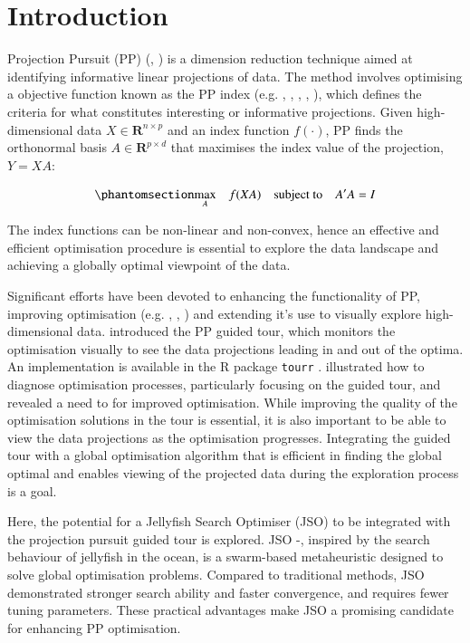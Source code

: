 \documentclass[
  number,
  preprint,
  3p]{elsarticle}
\begin{document}
\section{Introduction}\label{introduction}

Projection Pursuit (PP) (\citet{kr69}, \citet{FT74}) is a dimension
reduction technique aimed at identifying informative linear projections
of data. The method involves optimising a objective function known as
the PP index (e.g. \citet{hall1989polynomial},
\citet{cook1993projection}, \citet{lee2010projection},
\citet{Loperfido2018}, \citet{Loperfido2020}), which defines the
criteria for what constitutes interesting or informative projections.
Given high-dimensional data \(X \in \mathbf{R}^{n\times p}\) and an
index function \(f(\cdot)\), PP finds the orthonormal basis
\(A \in \mathbf{R}^{p \times d}\) that maximises the index value of the
projection, \(Y = XA\):

\begin{equation}\phantomsection\label{eq-optimization}{
\underset{A}{\max } \quad f(XA) \quad \text{subject to} \quad A'A = I
}\end{equation}

The index functions can be non-linear and non-convex, hence an effective
and efficient optimisation procedure is essential to explore the data
landscape and achieving a globally optimal viewpoint of the data.

Significant efforts have been devoted to enhancing the functionality of
PP, improving optimisation (e.g. \citet{posse1995},
\citet{marie-sainte2010}, \citet{grochowski2011}) and extending it's use
to visually explore high-dimensional data. \citet{cook1995grand}
introduced the PP guided tour, which monitors the optimisation visually
to see the data projections leading in and out of the optima. An
implementation is available in the R \citep{R} package \texttt{tourr}
\citep{tourr}. \citet{RJ-2021-105} illustrated how to diagnose
optimisation processes, particularly focusing on the guided tour, and
revealed a need to for improved optimisation. While improving the
quality of the optimisation solutions in the tour is essential, it is
also important to be able to view the data projections as the
optimisation progresses. Integrating the guided tour with a global
optimisation algorithm that is efficient in finding the global optimal
and enables viewing of the projected data during the exploration process
is a goal.

Here, the potential for a Jellyfish Search Optimiser (JSO) to be
integrated with the projection pursuit guided tour is explored. JSO
\citep{chou_novel_2021} -\citep{rajwar_exhaustive_2023}, inspired by the
search behaviour of jellyfish in the ocean, is a swarm-based
metaheuristic designed to solve global optimisation problems. Compared
to traditional methods, JSO demonstrated stronger search ability and
faster convergence, and requires fewer tuning parameters. These
practical advantages make JSO a promising candidate for enhancing PP
optimisation.
\end{document}
